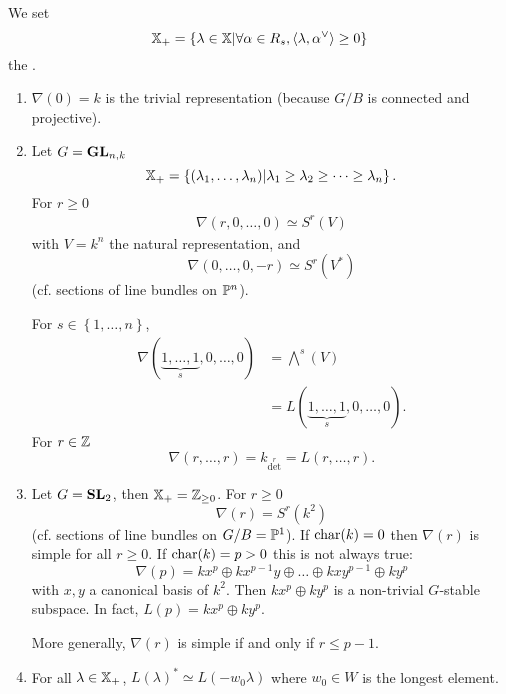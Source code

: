 We set
\[
\XX_+ = \left\{ \lambda\in \XX \middle| \forall \alpha\in R_s, \left<\lambda,\alpha ^{\vee} \right> \ge 0 \right\} 
\] 
the .
\begin{example}
	\begin{enumerate}[(1)]
		\item $\nabla(0)=k$ is the trivial representation (because $G /B$ is connected and projective).
		\item Let $G=\GL_{n,k}$
			\[
			\XX_+ = \left\{ (\lambda_1,\dots,\lambda_n) \middle| \lambda_1\ge \lambda_2\ge \dots\ge \lambda_n \right\} .
			\] 
			For $r\ge 0$ 
			\begin{align*}
				\nabla(r,0,\dots,0) \simeq S^{r}(V)
			\end{align*}
			with $V=k^{n}$ the natural representation, and
			\[
			\nabla(0,\dots,0,-r) \simeq S^{r}(V^{*})
			\] 
			(cf. sections of line bundles on $\P^{n}$).

			For $s \in \left\{ 1,\dots,n \right\} $,
			\begin{align*}
				\nabla(\underbrace{1,\dots,1}_{s},0,\dots,0) &= \bigwedge^{s}(V) \\
									     &= L(\underbrace{1,\dots,1}_s,0,\dots,0).
			\end{align*}
			For $r\in \Z$ 
			\[
			\nabla(r,\dots,r) = k_{\det ^{r}} = L(r,\dots,r).
			\]
		\item Let $G=\SL_2$, then $\XX_+ = \Z_{\ge 0}$. For $r\ge 0$ 
			\[
			\nabla(r) = S^{r}(k^2)
			\] 
			(cf. sections of line bundles on $G /B=\P^{1}$). If $\car(k)=0$ then $\nabla(r)$ is simple for all $r\ge 0$. If $\car(k)=p>0$ this is not always true:
			\[
			\nabla(p) = kx^{p} \oplus kx^{p-1}y \oplus \dots \oplus kxy^{p-1} \oplus ky^{p}
			\] 
			with $x,y$ a canonical basis of $k^2$. Then $kx^{p}\oplus ky^{p}$ is a non-trivial $G$-stable subspace. In fact, $L(p) = kx^{p}\oplus ky^{p}$.

			More generally, $\nabla(r)$ is simple if and only if $r\le p-1$.
		\item For all $\lambda\in \XX_+$, $L(\lambda)^{*}\simeq L(-w_0\lambda)$ where $w_0\in W$ is the longest element.
	\end{enumerate}
\end{example}

